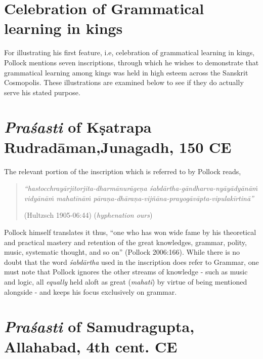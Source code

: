 \section*{Celebration of Grammatical learning in kings}

For illustrating his first feature, i.e, celebration of grammatical learning in kings, Pollock mentions seven inscriptions, through which he wishes to demonstrate that grammatical learning among kings was held in high esteem across the Sanskrit Cosmopolis. These illustrations are examined below to see if they do actually serve his stated purpose. 

\section{{\sl\bfseries Praśasti} of Kṣatrapa Rudradāman,\newline Junagadh, 150 CE}\label{chap3-sec1}

The relevant portion of the inscription which is referred to by Pollock reads,
\begin{quote}
{{\sl ``hastocchrayārjitorjita-dharmānurāgeṇa śabdārtha-gāndharva-nyāyādyānāṁ vidyānāṁ mahatīnāṁ pāraṇa-dhāraṇa-vijñāna-prayogāvāpta-vipulakīrtinā''}}

\hfill (Hultzsch 1905-06:44) ({\sl hyphenation ours})
\end{quote}

Pollock himself translates it thus, ``one who has won wide fame by his theoretical and practical mastery and retention of the great knowledges, grammar, polity, music, systematic thought, and so on'' (Pollock 2006:166). While there is no doubt that the word {\sl śabdārtha} used in the inscription does refer to Grammar, one must note that Pollock ignores the other streams of knowledge - such as music and logic, all {\sl equally} held aloft as great ({\sl mahatī}) by virtue of being mentioned alongside - and keeps his focus exclusively on grammar. 

\section{{\sl\bfseries Praśasti} of Samudragupta, Allahabad, 4th cent. CE}\label{chap3-sec2}

